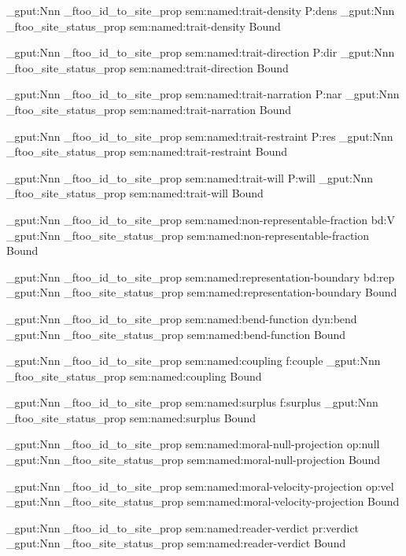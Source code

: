 \prop_gput:Nnn \g_ftoo_id_to_site_prop { sem:named:trait-density } { P:dens }
\prop_gput:Nnn \g_ftoo_site_status_prop { sem:named:trait-density } { Bound }

\prop_gput:Nnn \g_ftoo_id_to_site_prop { sem:named:trait-direction } { P:dir }
\prop_gput:Nnn \g_ftoo_site_status_prop { sem:named:trait-direction } { Bound }

\prop_gput:Nnn \g_ftoo_id_to_site_prop { sem:named:trait-narration } { P:nar }
\prop_gput:Nnn \g_ftoo_site_status_prop { sem:named:trait-narration } { Bound }

\prop_gput:Nnn \g_ftoo_id_to_site_prop { sem:named:trait-restraint } { P:res }
\prop_gput:Nnn \g_ftoo_site_status_prop { sem:named:trait-restraint } { Bound }

\prop_gput:Nnn \g_ftoo_id_to_site_prop { sem:named:trait-will } { P:will }
\prop_gput:Nnn \g_ftoo_site_status_prop { sem:named:trait-will } { Bound }

\prop_gput:Nnn \g_ftoo_id_to_site_prop { sem:named:non-representable-fraction } { bd:V }
\prop_gput:Nnn \g_ftoo_site_status_prop { sem:named:non-representable-fraction } { Bound }

\prop_gput:Nnn \g_ftoo_id_to_site_prop { sem:named:representation-boundary } { bd:rep }
\prop_gput:Nnn \g_ftoo_site_status_prop { sem:named:representation-boundary } { Bound }

\prop_gput:Nnn \g_ftoo_id_to_site_prop { sem:named:bend-function } { dyn:bend }
\prop_gput:Nnn \g_ftoo_site_status_prop { sem:named:bend-function } { Bound }

\prop_gput:Nnn \g_ftoo_id_to_site_prop { sem:named:coupling } { f:couple }
\prop_gput:Nnn \g_ftoo_site_status_prop { sem:named:coupling } { Bound }

\prop_gput:Nnn \g_ftoo_id_to_site_prop { sem:named:surplus } { f:surplus }
\prop_gput:Nnn \g_ftoo_site_status_prop { sem:named:surplus } { Bound }

\prop_gput:Nnn \g_ftoo_id_to_site_prop { sem:named:moral-null-projection } { op:null }
\prop_gput:Nnn \g_ftoo_site_status_prop { sem:named:moral-null-projection } { Bound }

\prop_gput:Nnn \g_ftoo_id_to_site_prop { sem:named:moral-velocity-projection } { op:vel }
\prop_gput:Nnn \g_ftoo_site_status_prop { sem:named:moral-velocity-projection } { Bound }

\prop_gput:Nnn \g_ftoo_id_to_site_prop { sem:named:reader-verdict } { pr:verdict }
\prop_gput:Nnn \g_ftoo_site_status_prop { sem:named:reader-verdict } { Bound }

